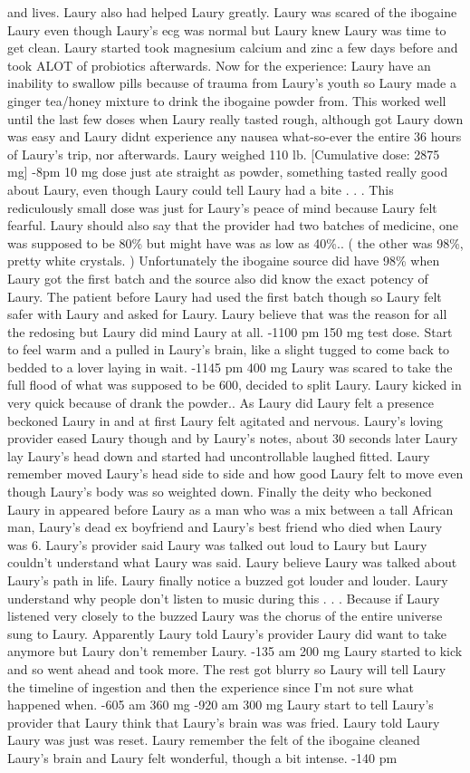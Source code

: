 \documentclass[12pt]{book}
\begin{document}
and lives. Laury also had helped Laury greatly. Laury was scared of the ibogaine Laury even though Laury's ecg was normal but Laury knew Laury was time to get clean. Laury started took magnesium calcium and zinc a few days before and took ALOT of probiotics afterwards. Now for the experience: Laury have an inability to swallow pills because of trauma from Laury's youth so Laury made a ginger tea/honey mixture to drink the ibogaine powder from. This worked well until the last few doses when Laury really tasted rough, although got Laury down was easy and Laury didnt experience any nausea what-so-ever the entire 36 hours of Laury's trip, nor afterwards. Laury weighed 110 lb. [Cumulative dose: 2875 mg] -8pm 10 mg dose just ate straight as powder, something tasted really good about Laury, even though Laury could tell Laury had a bite . . .  This rediculously small dose was just for Laury's peace of mind because Laury felt fearful. Laury should also say that the provider had two batches of medicine, one was supposed to be 80\% but might have was as low as 40\%.. ( the other was 98\%, pretty white crystals. ) Unfortunately the ibogaine source did have 98\% when Laury got the first batch and the source also did know the exact potency of Laury. The patient before Laury had used the first batch though so Laury felt safer with Laury and asked for Laury. Laury believe that was the reason for all the redosing but Laury did mind Laury at all. -1100 pm 150 mg test dose. Start to feel warm and a pulled in Laury's brain, like a slight tugged to come back to bedded to a lover laying in wait. -1145 pm 400 mg Laury was scared to take the full flood of what was supposed to be 600, decided to split Laury. Laury kicked in very quick because of drank the powder.. As Laury did Laury felt a presence beckoned Laury in and at first Laury felt agitated and nervous. Laury's loving provider eased Laury though and by Laury's notes, about 30 seconds later Laury lay Laury's head down and started had uncontrollable laughed fitted. Laury remember moved Laury's head side to side and how good Laury felt to move even though Laury's body was so weighted down. Finally the deity who beckoned Laury in appeared before Laury as a man who was a mix between a tall African man, Laury's dead ex boyfriend and Laury's best friend who died when Laury was 6. Laury's provider said Laury was talked out loud to Laury but Laury couldn't understand what Laury was said. Laury believe Laury was talked about Laury's path in life. Laury finally notice a buzzed got louder and louder. Laury understand why people don't listen to music during this . . .  Because if Laury listened very closely to the buzzed Laury was the chorus of the entire universe sung to Laury. Apparently Laury told Laury's provider Laury did want to take anymore but Laury don't remember Laury. -135 am 200 mg Laury started to kick and so went ahead and took more. The rest got blurry so Laury will tell Laury the timeline of ingestion and then the experience since I'm not sure what happened when. -605 am 360 mg -920 am 300 mg Laury start to tell Laury's provider that Laury think that Laury's brain was was fried. Laury told Laury Laury was just was reset. Laury remember the felt of the ibogaine cleaned Laury's brain and Laury felt wonderful, though a bit intense. -140 pm 
\end{document}
